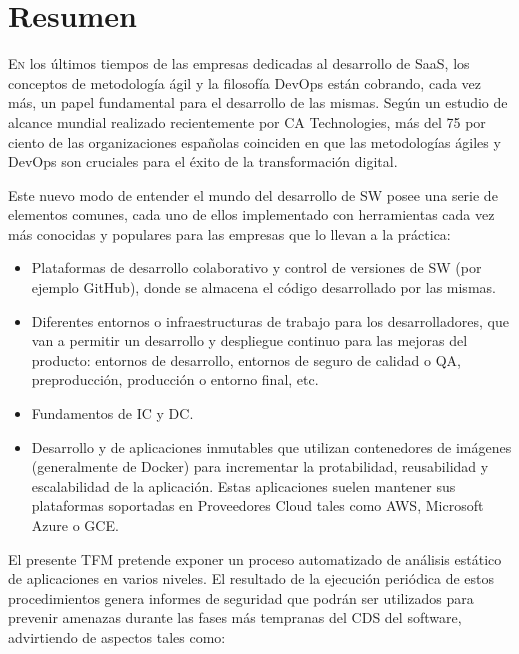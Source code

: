 \chapter*{Resumen}
\pagestyle{especial}
{}

\lettrine[lraise=-0.1, lines=2, loversize=0.2]{E}{n} los últimos tiempos de las empresas dedicadas al desarrollo de \gls{SaaS}, los conceptos de metodología ágil y la filosofía \gls{DevOps} están cobrando, cada vez más, un papel fundamental para el desarrollo de las mismas\cite{consultorit2017}. Según un estudio de alcance mundial realizado recientemente por CA Technologies, más del 75 por ciento de las organizaciones españolas coinciden en que las metodologías ágiles y \gls{DevOps} son cruciales para el éxito de la transformación digital\cite{catechnologies2017}.

Este nuevo modo de entender el mundo del desarrollo de \gls{SW} posee una serie de elementos comunes, cada uno de ellos implementado con herramientas cada vez más conocidas y populares para las empresas que lo llevan a la práctica: 

\begin{itemize}
	\item Plataformas de desarrollo colaborativo y control de versiones de \gls{SW} (por ejemplo GitHub\cite{github2017}), donde se almacena el código desarrollado por las mismas.
	\item Diferentes entornos o infraestructuras de trabajo para los desarrolladores, que van a permitir un desarrollo y despliegue continuo para las mejoras del producto: entornos de desarrollo, entornos de seguro de calidad o \gls{QA}, preproducción, producción o entorno final, etc.
	\item Fundamentos de \gls{IC} y \gls{DC}.
	\item Desarrollo y  de aplicaciones inmutables que utilizan contenedores de imágenes (generalmente de Docker\cite{docker2017}) para incrementar la protabilidad, reusabilidad y escalabilidad de la aplicación. Estas aplicaciones suelen mantener sus plataformas soportadas en Proveedores Cloud tales como \gls{AWS}\cite{aws2017}, Microsoft Azure\cite{azure2017} o \gls{GCE}\cite{google2017}.
\end{itemize}

El presente \gls{TFM} pretende exponer un proceso automatizado de análisis estático de aplicaciones en varios niveles. El resultado de la ejecución periódica de estos procedimientos genera informes de seguridad que podrán ser utilizados para prevenir amenazas durante las fases más tempranas del \gls{CDS} del software, advirtiendo de aspectos tales como:

